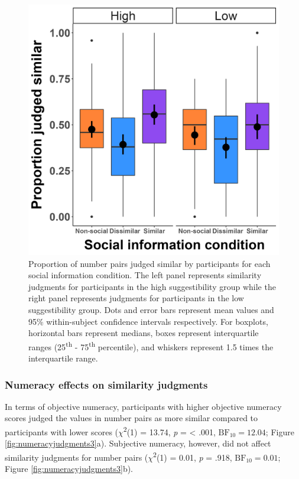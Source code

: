 \documentclass[
  pub,floatsintext]{apa6}
\begin{document}
\begin{figure}

{\centering \includegraphics[width=1\linewidth]{figures/suggestibility_social_info_3} 

}

\caption{Proportion of number pairs judged similar by participants for each social information condition. The left panel represents similarity judgments for participants in the high suggestibility group while the right panel represents judgments for participants in the low suggestibility group. Dots and error bars represent mean values and 95\% within-subject confidence intervals respectively. For boxplots, horizontal bars represent medians, boxes represent interquartile ranges (25\textsuperscript{th} - 75\textsuperscript{th} percentile), and whiskers represent 1.5 times the interquartile range.}\label{fig:suggestibility3}
\end{figure}

\hypertarget{numeracy-effects-on-similarity-judgments}{%
\subsubsection{Numeracy effects on similarity judgments}\label{numeracy-effects-on-similarity-judgments}}

In terms of objective numeracy, participants with higher objective numeracy scores judged the values in number pairs as more similar compared to participants with lower scores (\(\chi\)\textsuperscript{2}(1) = 13.74, \emph{p} = \textless{} .001, \(\mathrm{BF}_{\textrm{10}} = 12.04\); Figure \ref{fig:numeracyjudgments3}a). Subjective numeracy, however, did not affect similarity judgments for number pairs (\(\chi\)\textsuperscript{2}(1) = 0.01, \emph{p} = .918, \(\mathrm{BF}_{\textrm{10}} = 0.01\); Figure \ref{fig:numeracyjudgments3}b).
\end{document}
